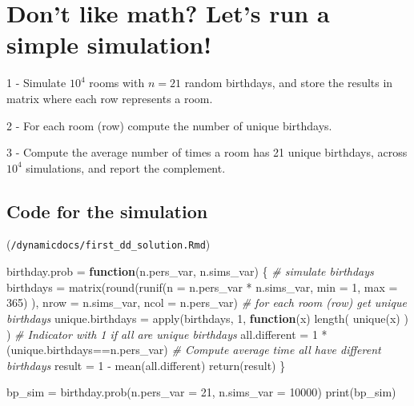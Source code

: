\documentclass[
]{book}
\newenvironment{Shaded}{\begin{snugshade}}{\end{snugshade}}
\newcommand{\AttributeTok}[1]{\textcolor[rgb]{0.77,0.63,0.00}{#1}}
\newcommand{\CommentTok}[1]{\textcolor[rgb]{0.56,0.35,0.01}{\textit{#1}}}
\newcommand{\ControlFlowTok}[1]{\textcolor[rgb]{0.13,0.29,0.53}{\textbf{#1}}}
\newcommand{\DecValTok}[1]{\textcolor[rgb]{0.00,0.00,0.81}{#1}}
\newcommand{\FunctionTok}[1]{\textcolor[rgb]{0.00,0.00,0.00}{#1}}
\newcommand{\NormalTok}[1]{#1}
\newcommand{\OtherTok}[1]{\textcolor[rgb]{0.56,0.35,0.01}{#1}}
\newcommand{\SpecialCharTok}[1]{\textcolor[rgb]{0.00,0.00,0.00}{#1}}
\begin{document}
\hypertarget{dont-like-math-lets-run-a-simple-simulation}{%
\chapter{Don't like math? Let's run a simple simulation!}\label{dont-like-math-lets-run-a-simple-simulation}}

1 - Simulate \ensuremath{10^{4}} rooms with \(n = 21\) random birthdays, and store the results in matrix where each row represents a room.

2 - For each room (row) compute the number of unique birthdays.

3 - Compute the average number of times a room has 21 unique birthdays, across \ensuremath{10^{4}} simulations, and report the complement.

\hypertarget{code-for-the-simulation}{%
\section{Code for the simulation}\label{code-for-the-simulation}}

(\texttt{/dynamicdocs/first\_dd\_solution.Rmd})

\begin{Shaded}
\begin{Highlighting}[]
\NormalTok{birthday.prob }\OtherTok{=} \ControlFlowTok{function}\NormalTok{(n.pers\_var, n.sims\_var) \{}
  \CommentTok{\# simulate birthdays}
\NormalTok{  birthdays }\OtherTok{=} \FunctionTok{matrix}\NormalTok{(}\FunctionTok{round}\NormalTok{(}\FunctionTok{runif}\NormalTok{(}\AttributeTok{n =}\NormalTok{ n.pers\_var }\SpecialCharTok{*}\NormalTok{ n.sims\_var, }\AttributeTok{min =} \DecValTok{1}\NormalTok{, }\AttributeTok{max =} \DecValTok{365}\NormalTok{) ),}
                     \AttributeTok{nrow =}\NormalTok{ n.sims\_var, }\AttributeTok{ncol =}\NormalTok{ n.pers\_var)}
  \CommentTok{\# for each room (row) get unique birthdays}
\NormalTok{  unique.birthdays }\OtherTok{=} \FunctionTok{apply}\NormalTok{(birthdays, }\DecValTok{1}\NormalTok{,}
                           \ControlFlowTok{function}\NormalTok{(x)  }\FunctionTok{length}\NormalTok{( }\FunctionTok{unique}\NormalTok{(x) ) )}
  \CommentTok{\# Indicator with 1 if all are unique birthdays}
\NormalTok{  all.different }\OtherTok{=} \DecValTok{1} \SpecialCharTok{*}\NormalTok{ (unique.birthdays}\SpecialCharTok{==}\NormalTok{n.pers\_var)}
  \CommentTok{\# Compute average time all have different birthdays }
\NormalTok{  result }\OtherTok{=} \DecValTok{1} \SpecialCharTok{{-}} \FunctionTok{mean}\NormalTok{(all.different)}
\FunctionTok{return}\NormalTok{(result)}
\NormalTok{\}}

\NormalTok{bp\_sim }\OtherTok{=} \FunctionTok{birthday.prob}\NormalTok{(}\AttributeTok{n.pers\_var =} \DecValTok{21}\NormalTok{, }\AttributeTok{n.sims\_var =} \DecValTok{10000}\NormalTok{)}
\FunctionTok{print}\NormalTok{(bp\_sim)}
\end{Highlighting}
\end{Shaded}
\end{document}

